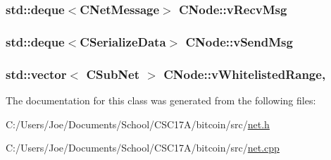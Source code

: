 \subsubsection[{v\+Recv\+Msg}]{\setlength{\rightskip}{0pt plus 5cm}std\+::deque$<${\bf C\+Net\+Message}$>$ C\+Node\+::v\+Recv\+Msg}\label{class_c_node_a015361812daa5b6ebb9a5692ddf67a54}
\hypertarget{class_c_node_a68e5fb1a80fe4247aa577a3c9a74b399}{}
\subsubsection[{v\+Send\+Msg}]{\setlength{\rightskip}{0pt plus 5cm}std\+::deque$<$C\+Serialize\+Data$>$ C\+Node\+::v\+Send\+Msg}\label{class_c_node_a68e5fb1a80fe4247aa577a3c9a74b399}
\hypertarget{class_c_node_afaac354c1226990e4e9407ba2ee4cbf9}{}
\subsubsection[{v\+Whitelisted\+Range}]{\setlength{\rightskip}{0pt plus 5cm}std\+::vector$<$ {\bf C\+Sub\+Net} $>$ C\+Node\+::v\+Whitelisted\+Range\hspace{0.3cm}{\ttfamily [static]}, {\ttfamily [protected]}}\label{class_c_node_afaac354c1226990e4e9407ba2ee4cbf9}


The documentation for this class was generated from the following files\+:\begin{DoxyCompactItemize}
\item 
C\+:/\+Users/\+Joe/\+Documents/\+School/\+C\+S\+C17\+A/bitcoin/src/\hyperlink{net_8h}{net.\+h}\item 
C\+:/\+Users/\+Joe/\+Documents/\+School/\+C\+S\+C17\+A/bitcoin/src/\hyperlink{net_8cpp}{net.\+cpp}\end{DoxyCompactItemize}
